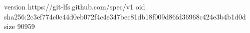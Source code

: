 version https://git-lfs.github.com/spec/v1
oid sha256:2c3ef774c0e44d0eb072f4c4e347bec81db18f009d86fd36968c424e3b4b1d0d
size 90959
